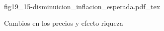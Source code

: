 \begin{figure}[h]
\centering
\def\svgwidth{0.5\textwidth}
{fig19_15-disminuicion_inflacion_esperada.pdf_tex}
\caption{Cambios en los precios y efecto riqueza}
\label{fig19_15-disminuicion_inflacion_esperada}
\end{figure}